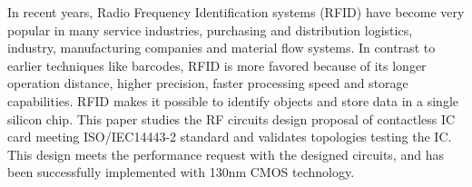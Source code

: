In recent years, Radio Frequency Identification systems (RFID) \cite{rfid_handbook} have become very popular in many service industries, purchasing and distribution logistics, industry, manufacturing companies and material flow systems. In contrast to earlier techniques like barcodes, RFID is more favored because of its longer operation distance, higher precision, faster processing speed and storage capabilities. RFID makes it possible to identify objects and store data in a single silicon chip. This paper studies the RF circuits design proposal of contactless IC card meeting ISO/IEC14443-2 \cite{nfc_spec} standard and validates topologies testing the IC. This design meets the performance request with the designed circuits, and has been successfully implemented with 130nm CMOS technology.